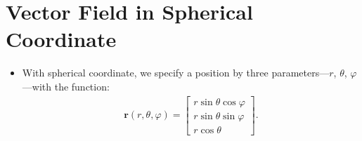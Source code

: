 \documentclass[10pt]{article}
\newcommand{\ve}[1]{\mathbf{#1}}
\begin{document}
  \section{Vector Field in Spherical Coordinate}
  \begin{itemize}
    \item With spherical coordinate, we specify a position by three parameters---$r$, $\theta$, $\varphi$---with the function:
    \begin{align*}
      \ve{r}(r, \theta, \varphi) = \begin{bmatrix}
        r \sin\theta \cos\varphi \\
        r \sin\theta \sin\varphi \\
        r \cos\theta
      \end{bmatrix}.
    \end{align*}


\end{itemize}
\end{document}
